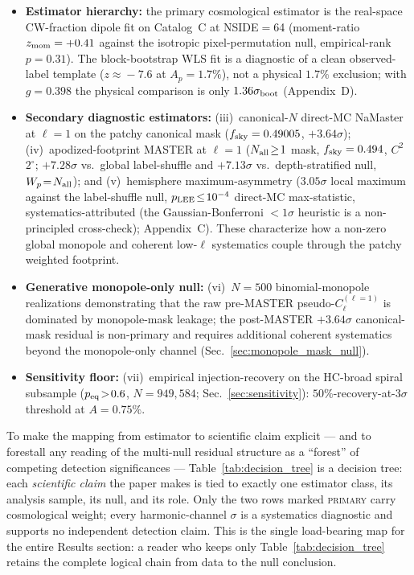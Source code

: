 \documentclass[aps,prd,twocolumn,superscriptaddress,preprintnumbers,nofootinbib,longbibliography,floatfix]{revtex4-2}
\newcommand{\sigmaunit}{\sigma}
\begin{document}
\begin{itemize}\setlength{\itemsep}{0pt}
\item \textbf{Estimator hierarchy:} the primary cosmological estimator is the real-space CW-fraction dipole fit on Catalog~C at NSIDE$=$64 (moment-ratio $z_{\rm mom}=+0.41$ against the isotropic pixel-permutation null, empirical-rank $p=0.31$). The block-bootstrap WLS fit is a diagnostic of a clean observed-label template ($z\!\approx\!-7.6$ at $A_p=1.7\%$), not a physical $1.7\%$ exclusion; with $g=0.398$ the physical comparison is only $1.36\sigma_{\rm boot}$ (Appendix~D).
\item \textbf{Secondary diagnostic estimators:} (iii)~canonical-$N$ direct-MC NaMaster at $\ell=1$ on the patchy canonical mask ($f_{\rm sky}=0.49005$, $+3.64\sigmaunit$); (iv)~apodized-footprint MASTER at $\ell=1$ ($N_{\rm all}\!\geq\!1$ mask, $f_{\rm sky}=0.494$, $C^2$ $2^\circ$; $+7.28\sigmaunit$ vs.\ global label-shuffle and $+7.13\sigmaunit$ vs.\ depth-stratified null, $W_p\!=\!N_{\rm all}$); and (v)~hemisphere maximum-asymmetry ($3.05\sigmaunit$ local maximum against the label-shuffle null, $p_{\rm LEE}\!\le\!10^{-4}$ direct-MC max-statistic, systematics-attributed (the Gaussian-Bonferroni $<\!1\sigmaunit$ heuristic is a non-principled cross-check); Appendix~C). These characterize how a non-zero global monopole and coherent low-$\ell$ systematics couple through the patchy weighted footprint.
\item \textbf{Generative monopole-only null:} (vi)~$N=500$ binomial-monopole realizations demonstrating that the raw pre-MASTER pseudo-$C_\ell^{(\ell=1)}$ is dominated by monopole-mask leakage; the post-MASTER $+3.64\sigmaunit$ canonical-mask residual is non-primary and requires additional coherent systematics beyond the monopole-only channel (Sec.~\ref{sec:monopole_mask_null}).
\item \textbf{Sensitivity floor:} (vii)~empirical injection-recovery on the HC-broad spiral subsample ($p_{\rm eq}\!>\!0.6$, $N\!=\!949{,}584$; Sec.~\ref{sec:sensitivity}): $50\%$-recovery-at-$3\sigma$ threshold at $A\!=\!0.75\%$.
\end{itemize}

To make the mapping from estimator to scientific claim explicit --- and to forestall any reading of the multi-null residual structure as a ``forest'' of competing detection significances --- Table~\ref{tab:decision_tree} is a decision tree: each \emph{scientific claim} the paper makes is tied to exactly one estimator class, its analysis sample, its null, and its role. Only the two rows marked \textsc{primary} carry cosmological weight; every harmonic-channel $\sigma$ is a systematics diagnostic and supports no independent detection claim. This is the single load-bearing map for the entire Results section: a reader who keeps only Table~\ref{tab:decision_tree} retains the complete logical chain from data to the null conclusion.
\end{document}
